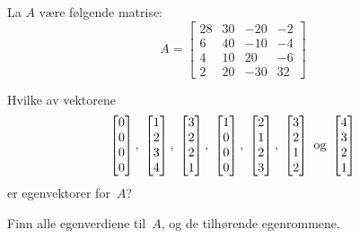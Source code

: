 \begin{oppgave}
La $A$ være følgende matrise:
\[
A =
\begin{bmatrix}
 28 & 30 & -20 & -2 \\
 6 & 40 & -10 & -4 \\
 4 & 10 & 20 & -6 \\
 2 & 20 & -30 & 32
\end{bmatrix}
\]
\begin{punkt}
Hvilke av vektorene
\[
\vvvv{0}{0}{0}{0},\ %
\vvvv{1}{2}{3}{4},\ %
\vvvv{3}{2}{2}{1},\ %
\vvvv{1}{0}{0}{0},\ %
\vvvv{2}{1}{2}{3},\ %
\vvvv{3}{2}{1}{2}\ \text{og}\ %
\vvvv{4}{3}{2}{1}
\]
er egenvektorer for~$A$?
\end{punkt}
\begin{punkt}
Finn alle egenverdiene til~$A$, og de tilhørende egenrommene.
\end{punkt}
\end{oppgave}

